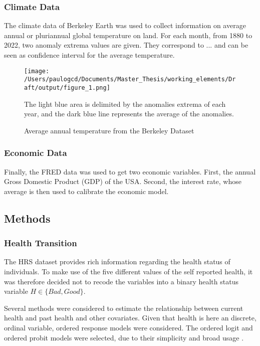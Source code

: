 \documentclass{article}
\begin{document}
\subsubsection{Climate Data}

The climate data of Berkeley Earth was used to collect information
on average annual or pluriannual global temperature on land. 
For each month, from 1880 to 2022, two anomaly extrema values are given. 
They correspond to ... and can be seen as confidence interval for the
average temperature. 

\begin{figure}[h]
    \texttt{[image: /Users/paulogcd/Documents/Master\_Thesis/working\_elements/Draft/output/figure\_1.png]}
    \caption{Average annual temperature from the Berkeley Dataset}
    
    The light blue area is delimited by the anomalies extrema of each year, and
    the dark blue line represents the average of the anomalies.
\end{figure}

\subsubsection{Economic Data}

Finally, the FRED data was used to get two economic variables. 
First, the annual Gross Domestic Product (GDP) of the USA. 
Second, the interest rate, whose average is then used to calibrate the economic model.

\subsection{Methods}

\subsubsection{Health Transition}

The HRS dataset provides rich information regarding the health status of individuals. 
To make use of the five different values of the self reported health, it was therefore decided not to
recode the variables into a binary health status variable $H\in\{Bad, Good\}$. 

Several methods were considered to estimate the relationship between current health and past health and other covariates. 
Given that health is here an discrete, ordinal variable, ordered response models were considered.
The ordered logit and ordered probit models were selected, due to their simplicity and broad usage \parencite{Wooldridge_2010}.
\end{document}
